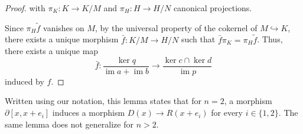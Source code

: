 \documentclass[a4paper]{article}
\DeclareMathOperator{\im}{im}
\newcommand{\bx}{{\kern.15em\line(1,0){3}\line(0,1){3}%
\raisebox{.3em}{\line(-1,0){3}\line(0,-1){3}\kern.3em}}}
\begin{document}
\begin{proof}
    with \(\pi_K \colon K \to K/M\) and \(\pi_H \colon H \to H/N\) canonical projections.

    Since \(\pi_H \tilde f\) vanishes on \(M\), by the universal property of the cokernel of \(M \hookrightarrow K\),
    there exists a unique morphism \(\bar f \colon K/M \to H/N\) such that \(\bar f \pi_K = \pi_H \tilde f\).
    Thus, there exists a unique map
    \[
        \bar f \colon \frac{\ker q}{\im a + \im b} \to \frac{\ker c \cap \ker d}{\im p} 
    \]
    induced by \(f\).
\end{proof}


Written using our notation, this lemma states that for \(n=2\), a morphism \(\partial[x,x+e_i]\) induces
a morphism \(D(x) \to R(x + e_i)\) for every \(i \in \{1, 2\}\).
The same lemma does not generalize for \(n>2\).
\end{document}
